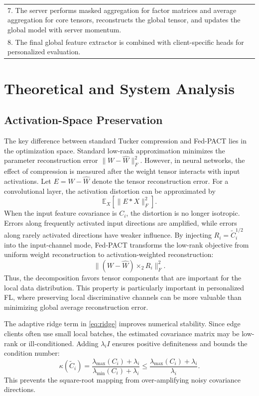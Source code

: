 \documentclass[conference]{IEEEtran}
\begin{document}
\begin{table}[t]
\begin{tabular}{p{}}
        7. The server performs masked aggregation for factor matrices and average aggregation for core tensors, reconstructs the global tensor, and updates the global model with server momentum. \\
        8. The final global feature extractor is combined with client-specific heads for personalized evaluation.                                                                                  \\
        \bottomrule
    \end{tabular}
\end{table}

\section{Theoretical and System Analysis}
\subsection{Activation-Space Preservation}
The key difference between standard Tucker compression and Fed-PACT lies in the optimization space. Standard low-rank approximation minimizes the parameter reconstruction error $\|W-\hat{W}\|_F^2$. However, in neural networks, the effect of compression is measured after the weight tensor interacts with input activations. Let $E=W-\hat{W}$ denote the tensor reconstruction error. For a convolutional layer, the activation distortion can be approximated by
\begin{equation}
    \mathbb{E}_{X}\left[\|E*X\|_F^2\right].
\end{equation}
When the input feature covariance is $C_i$, the distortion is no longer isotropic. Errors along frequently activated input directions are amplified, while errors along rarely activated directions have weaker influence. By injecting $R_i=\tilde{C}_i^{1/2}$ into the input-channel mode, Fed-PACT transforms the low-rank objective from uniform weight reconstruction to activation-weighted reconstruction:
\begin{equation}
    \| (W-\hat{W})\times_2 R_i \|_F^2.
\end{equation}
Thus, the decomposition favors tensor components that are important for the local data distribution. This property is particularly important in personalized FL, where preserving local discriminative channels can be more valuable than minimizing global average reconstruction error.

The adaptive ridge term in \eqref{eq:ridge} improves numerical stability. Since edge clients often use small local batches, the estimated covariance matrix may be low-rank or ill-conditioned. Adding $\lambda_i I$ ensures positive definiteness and bounds the condition number:
\begin{equation}
    \kappa(\tilde{C}_i)
    =
    \frac{\lambda_{\max}(C_i)+\lambda_i}
    {\lambda_{\min}(C_i)+\lambda_i}
    \leq
    \frac{\lambda_{\max}(C_i)+\lambda_i}{\lambda_i}.
\end{equation}
This prevents the square-root mapping from over-amplifying noisy covariance directions.
\end{document}

